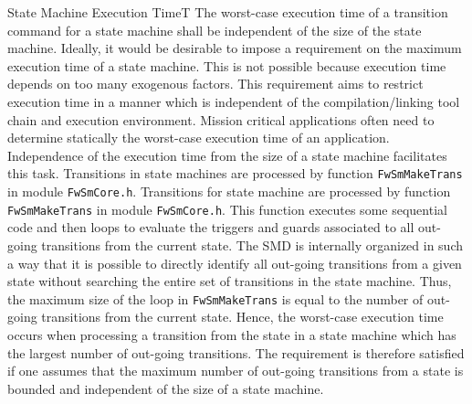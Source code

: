 \documentclass[requirements]{../fwprofile}
\begin{document}
\begin{fw_req_note}{State Machine Execution Time}{T}
{The worst-case execution time of a transition command for a
state machine shall be independent of the size of the state machine.}
{Ideally, it would be desirable to impose a requirement on the 
maximum execution time of a state machine. 
This is not possible because execution time depends on too many exogenous factors. 
This requirement aims to restrict execution time in a manner which is 
independent of the compilation/linking tool chain and execution environment.}
{Mission critical applications often need to determine 
statically the worst-case execution time of an application. 
Independence of the execution time from the size of a state machine facilitates this task.}
{Transitions in state machines are processed by function 
\texttt{FwSmMakeTrans} in module \texttt{FwSmCore.h}.} 
{Transitions for state machine are processed by function 
\texttt{FwSmMakeTrans} in module \texttt{FwSmCore.h}. 
This function executes some sequential code and then loops to evaluate the triggers 
and guards associated to all out-going transitions from the current state. 
The SMD is internally organized in such a way that it is possible to directly identify 
all out-going transitions from a given state without searching the entire set of transitions 
in the state machine. 
Thus, the maximum size of the loop in \texttt{FwSmMakeTrans} is equal to the number of out-going 
transitions from the current state. Hence, the worst-case execution time occurs when processing 
a transition from the state in a state machine which has the largest number of out-going transitions. 
The requirement is therefore satisfied if one assumes that the maximum number of out-going 
transitions from a state is bounded and independent of the size of a state machine.}
\end{fw_req_note}
\end{document}
